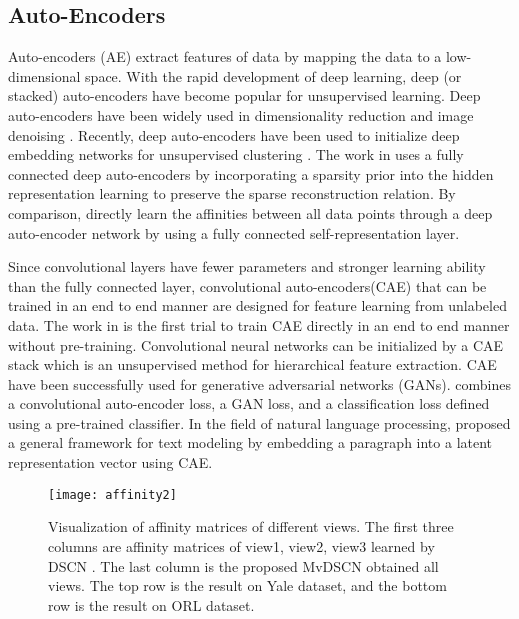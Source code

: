 \documentclass[journal]{IEEEtran}
\begin{document}
\subsection{Auto-Encoders}
Auto-encoders (AE) extract features of data by mapping the data to a low-dimensional space.
With the rapid development of deep learning, deep (or stacked) auto-encoders have become popular for unsupervised learning.
Deep auto-encoders have been widely used in dimensionality reduction \cite{Hinton2006ReducingTD} and image denoising \cite{Vincent2010StackedDA}.
Recently, deep auto-encoders have been used to initialize deep embedding networks for unsupervised clustering \cite{Xie2016UnsupervisedDE}.
The work in \cite{Peng2016DeepSC} uses a fully connected deep auto-encoders by incorporating a sparsity prior into the hidden representation learning to preserve the sparse reconstruction relation.
By comparison, \cite{ji2017deep} directly learn the affinities between all data points through a deep auto-encoder network by using a fully connected  self-representation layer.

Since convolutional layers have fewer parameters and stronger learning ability than the fully connected layer, convolutional auto-encoders(CAE) that can be trained in an end to end manner are designed for feature learning from unlabeled data.
The work in \cite{Li2018DiscriminativelyBI} is the first trial to train CAE directly in an end to end manner without pre-training.
Convolutional neural networks can be initialized by a CAE stack \cite{Masci2011StackedCA} which is an unsupervised method for hierarchical feature extraction.
CAE have been successfully used for generative adversarial networks (GANs).
\cite{Nguyen2017PlugP} combines a convolutional auto-encoder loss, a GAN loss, and a classification loss defined using a pre-trained classifier.
In the field of natural language processing, \cite{Zhang2017DeconvolutionalPR} proposed a general framework for text modeling by embedding a paragraph into a latent representation vector using CAE.



\begin{figure*}
	\centering
	\texttt{[image: affinity2]}
	\caption{Visualization of affinity matrices of different views.
             The first three columns are affinity matrices of view1, view2, view3 learned by DSCN \cite{ji2017deep}.
             The last column is the proposed MvDSCN obtained all views.
             The top row is the result on Yale dataset, and the bottom row is the result on ORL dataset.}
	\label{affinity}
\end{figure*}
\end{document}
